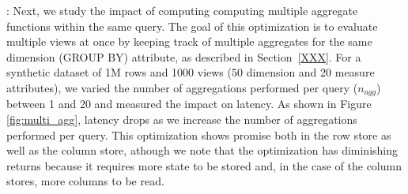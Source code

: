 
: Next, we study the impact of
computing computing multiple aggregate functions within the same query.
The goal of this optimization is to evaluate multiple views at once by keeping
track of multiple aggregates for the same dimension (GROUP BY) attribute, as described in Section~\ref{XXX}.
For a synthetic dataset of 1M rows and 1000 views (50 dimension and 20 measure
attributes), we varied the number of aggregations performed per query
($n_{agg}$) between 1 and 20 and measured the impact on latency.
As shown in Figure \ref{fig:multi_agg}, latency drops as we increase the
number of aggregations performed per query.
This optimization shows promise both in the row store as well as the column
store, athough we note that the optimization has diminishing returns because it
requires more state to be stored and, in the case of the column stores, more
columns to be read.      \\


